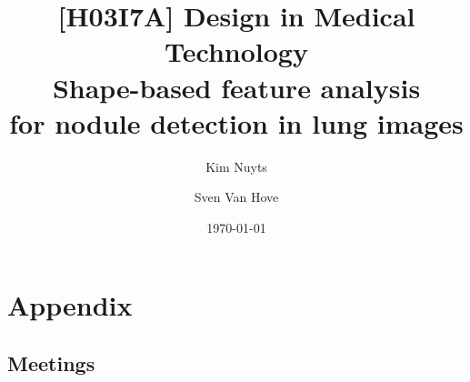 \documentclass[titlepage, 10pt]{article}
\title
{
	[H03I7A] Design in Medical Technology\\
	Shape-based feature analysis\\
	for nodule detection in lung images
}
\author{Kim Nuyts \and Sven Van Hove}
\date{\today}
\begin{document}
\maketitle

\clearpage
{} %
\tableofcontents
\clearpage

\setlength{\parindent}{0pt} %
\setlength{\parskip}{2ex} %


\clearpage
{} %












\clearpage
\appendix
\section{Appendix}
\subsection{Meetings}








\clearpage

\end{document}
